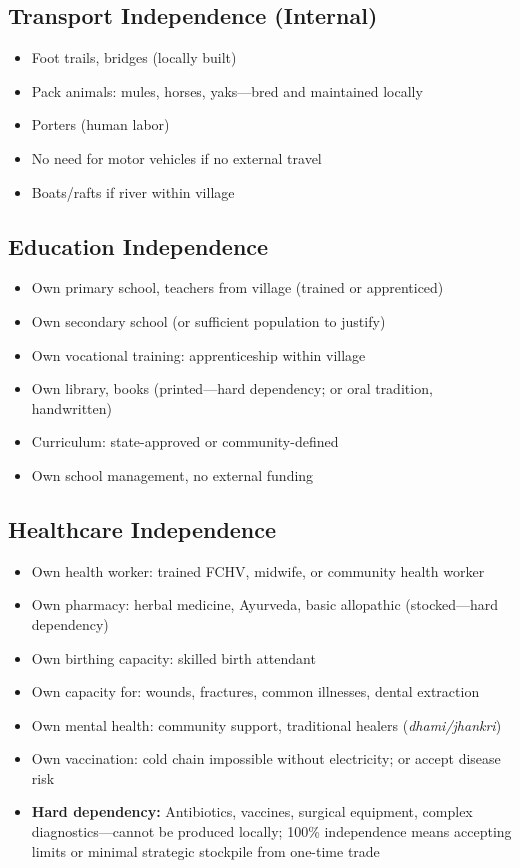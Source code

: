 \documentclass[11pt,a4paper]{article}
\begin{document}
\subsection{Transport Independence (Internal)}
\begin{itemize}
    \item Foot trails, bridges (locally built)
    \item Pack animals: mules, horses, yaks---bred and maintained locally
    \item Porters (human labor)
    \item No need for motor vehicles if no external travel
    \item Boats/rafts if river within village
\end{itemize}

\subsection{Education Independence}
\begin{itemize}
    \item Own primary school, teachers from village (trained or apprenticed)
    \item Own secondary school (or sufficient population to justify)
    \item Own vocational training: apprenticeship within village
    \item Own library, books (printed---hard dependency; or oral tradition, handwritten)
    \item Curriculum: state-approved or community-defined
    \item Own school management, no external funding
\end{itemize}

\subsection{Healthcare Independence}
\begin{itemize}
    \item Own health worker: trained FCHV, midwife, or community health worker
    \item Own pharmacy: herbal medicine, Ayurveda, basic allopathic (stocked---hard dependency)
    \item Own birthing capacity: skilled birth attendant
    \item Own capacity for: wounds, fractures, common illnesses, dental extraction
    \item Own mental health: community support, traditional healers (\textit{dhami/jhankri})
    \item Own vaccination: cold chain impossible without electricity; or accept disease risk
    \item \textbf{Hard dependency:} Antibiotics, vaccines, surgical equipment, complex diagnostics---cannot be produced locally; 100\% independence means accepting limits or minimal strategic stockpile from one-time trade
\end{itemize}
\end{document}
